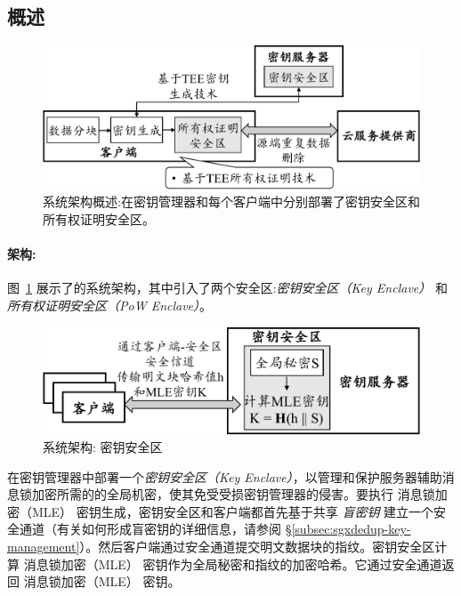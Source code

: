 \subsection{概述}
\label{subsec:sgxdedup-arch}

\begin{figure}[t]
\centering
\includegraphics[width=\textwidth]{pic/sgxdedup/sgxdedup-arch.pdf}
\caption{\sysnameS 系统架构概述:\sysnameS 在密钥管理器和每个客户端中分别部署了密钥安全区和所有权证明安全区。}
\label{fig:sgxdedup-overview}
\vspace{-3pt}
\end{figure}

\paragraph*{架构:} 图~\ref{fig:sgxdedup-overview} 展示了\sysnameS 的系统架构，其中引入了两个安全区:\textit{密钥安全区（Key Enclave）} 和 \textit{所有权证明安全区（PoW Enclave）}。 

\begin{figure}[!htb]
  \centering
  \includegraphics[width=\textwidth]{pic/sgxdedup/key-enclave.pdf}
  \caption{\sysnameS 系统架构: 密钥安全区}
  \label{fig:sgxdedup-overview-key}
  \vspace{-3pt}
\end{figure}


\sysnameS 在密钥管理器中部署一个\textit{密钥安全区（Key Enclave）}，以管理和保护服务器辅助消息锁加密所需的的全局机密，使其免受受损密钥管理器的侵害。要执行 消息锁加密（MLE） 密钥生成，密钥安全区和客户端都首先基于共享 \textit{盲密钥} 建立一个安全通道（有关如何形成盲密钥的详细信息，请参阅 \S\ref{subsec:sgxdedup-key-management}）。然后客户端通过安全通道提交明文数据块的指纹。密钥安全区计算 消息锁加密（MLE） 密钥作为全局秘密和指纹的加密哈希。它通过安全通道返回 消息锁加密（MLE） 密钥。

